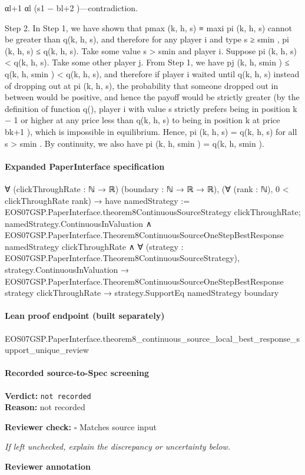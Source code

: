 \documentclass[10pt]{article}
\newcommand{\reviewerbox}{%
  \par\noindent\fbox{\parbox{0.96\linewidth}{\rule{0pt}{0.38in}}}\par
}
\newcommand{\reviewmatch}[1]{%
  \par\noindent\textbf{Reviewer check:} $\square$\; #1\par
  \noindent\emph{If left unchecked, explain the discrepancy or uncertainty below.}\par
}
\begin{document}
\begin{ReviewVerbatim}
αl+1
αl (s1 − bl+2 )—contradiction.

Step 2. In Step 1, we have shown that pmax (k, h, s) ≡ maxi pi (k, h, s) cannot be greater than
q(k, h, s), and therefore for any player i and type s ≥ smin , pi (k, h, s) ≤ q(k, h, s). Take some value
s > smin and player i. Suppose pi (k, h, s) < q(k, h, s). Take some other player j. From Step 1,
we have pj (k, h, smin ) ≤ q(k, h, smin ) < q(k, h, s), and therefore if player i waited until q(k, h, s)
instead of dropping out at pi (k, h, s), the probability that someone dropped out in between would
be positive, and hence the payoff would be strictly greater (by the definition of function q(), player
i with value s strictly prefers being in position k − 1 or higher at any price less than q(k, h, s) to
being in position k at price bk+1 ), which is impossible in equilibrium. Hence, pi (k, h, s) = q(k, h, s)
for all s > smin . By continuity, we also have pi (k, h, smin ) = q(k, h, smin ).
\end{ReviewVerbatim}


\paragraph{Expanded PaperInterface specification}
\begin{ReviewVerbatim}
∀ (clickThroughRate : ℕ → ℝ) (boundary : ℕ → ℝ → ℝ),
  (∀ (rank : ℕ), 0 < clickThroughRate rank) →
    have namedStrategy := EOS07GSP.PaperInterface.theorem8ContinuousSourceStrategy clickThroughRate;
    namedStrategy.ContinuousInValuation ∧
      EOS07GSP.PaperInterface.Theorem8ContinuousSourceOneStepBestResponse namedStrategy clickThroughRate ∧
        ∀ (strategy : EOS07GSP.PaperInterface.Theorem8ContinuousSourceStrategy),
          strategy.ContinuousInValuation →
            EOS07GSP.PaperInterface.Theorem8ContinuousSourceOneStepBestResponse strategy clickThroughRate →
              strategy.SupportEq namedStrategy boundary
\end{ReviewVerbatim}

\paragraph{Lean proof endpoint (built separately)}\begin{ReviewVerbatim}
EOS07GSP.PaperInterface.theorem8_continuous_source_local_best_response_support_unique_review
\end{ReviewVerbatim}

\paragraph{Recorded source-to-Spec screening}
\textbf{Verdict:} \texttt{not recorded}
\\
\textbf{Reason:} not recorded
\reviewmatch{Matches source input}
\noindent\textbf{Reviewer annotation}\par
\reviewerbox
\clearpage
\hypertarget{source-claim-4341153fb5248b25}{}
\end{document}
